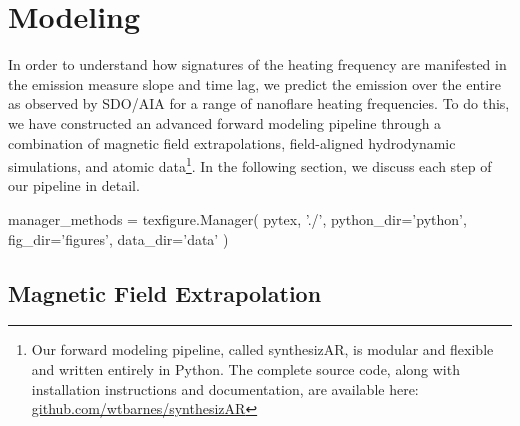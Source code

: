 \section{Modeling}\label{modeling}

In order to understand how signatures of the heating frequency are manifested in the emission measure slope and time lag, we predict the emission over the entire \AR{} as observed by SDO/AIA for a range of nanoflare heating frequencies. To do this, we have constructed an advanced forward modeling pipeline through a combination of magnetic field extrapolations, field-aligned hydrodynamic simulations, and atomic data\footnote{Our forward modeling pipeline, called synthesizAR, is modular and flexible and written entirely in Python. The complete source code, along with installation instructions and documentation, are available here: \href{https://github.com/wtbarnes/synthesizAR}{github.com/wtbarnes/synthesizAR}}. In the following section, we discuss each step of our pipeline in detail.

\begin{pycode}
manager_methods = texfigure.Manager(
    pytex, './',
    python_dir='python',
    fig_dir='figures',
    data_dir='data'
)
\end{pycode}

\subsection{Magnetic Field Extrapolation}\label{field}


